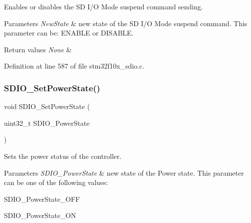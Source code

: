 Enables or disables the SD I/O Mode suspend command sending. 


\begin{DoxyParams}{Parameters}
{\em New\+State} & new state of the SD I/O Mode suspend command. This parameter can be\+: E\+N\+A\+B\+LE or D\+I\+S\+A\+B\+LE. \\
\hline
\end{DoxyParams}

\begin{DoxyRetVals}{Return values}
{\em None} & \\
\hline
\end{DoxyRetVals}


Definition at line 587 of file stm32f10x\+\_\+sdio.\+c.

\mbox{\label{group___s_d_i_o___exported___functions_ga36ecca32b904de74218fbe65cd5f5270}} 
\subsubsection{\texorpdfstring{S\+D\+I\+O\+\_\+\+Set\+Power\+State()}{SDIO\_SetPowerState()}}
{\footnotesize\ttfamily void S\+D\+I\+O\+\_\+\+Set\+Power\+State (\begin{DoxyParamCaption}\item[{uint32\+\_\+t}]{S\+D\+I\+O\+\_\+\+Power\+State }\end{DoxyParamCaption})}



Sets the power status of the controller. 


\begin{DoxyParams}{Parameters}
{\em S\+D\+I\+O\+\_\+\+Power\+State} & new state of the Power state. This parameter can be one of the following values\+: \begin{DoxyItemize}
\item S\+D\+I\+O\+\_\+\+Power\+State\+\_\+\+O\+FF \item S\+D\+I\+O\+\_\+\+Power\+State\+\_\+\+ON \end{DoxyItemize}
\\
\hline
\end{DoxyParams}

